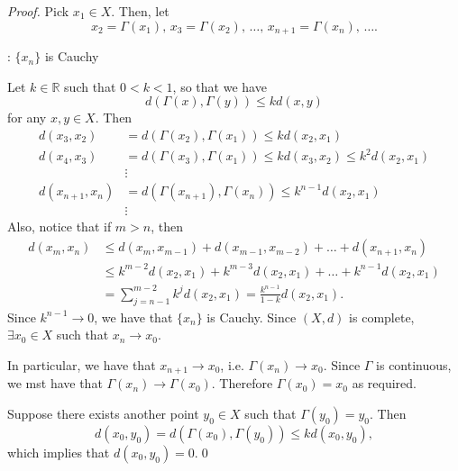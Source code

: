 \documentclass[notoc,notitlepage]{tufte-book}
\begin{document}
\begin{proof}
  Pick $x_1 \in X$. Then, let
  \begin{equation*}
    x_2 = \Gamma(x_1), \, x_3 = \Gamma(x_2), \, \ldots , \, x_{n + 1} = \Gamma(x_n), \, \ldots .
  \end{equation*}

  \noindent
  : $\{ x_n \}$ is Cauchy

  Let $k \in \mathbb{R}$ such that $0 < k < 1$, so that we have
  \begin{equation*}
    d \left( \Gamma(x), \Gamma(y) \right) \leq k d(x, y)
  \end{equation*}
  for any $x, y \in X$. Then
  \begin{align*}
    d(x_3, x_2) &= d( \Gamma(x_2), \Gamma(x_1) ) \leq k d(x_2, x_1) \\
    d(x_4, x_3) &= d( \Gamma(x_3), \Gamma(x_1) ) \leq k d(x_3, x_2) \leq k^2 d(x_2, x_1) \\
                & \vdots \\
    d(x_{n + 1}, x_n) &= d( \Gamma(x_{n + 1}), \Gamma(x_n) ) \leq k^{n - 1} d(x_2, x_1) \\
                      & \vdots
  \end{align*}
  Also, notice that if $m > n$, then
  \begin{align*}
    d(x_m, x_n) &\leq d(x_m, x_{m - 1}) + d(x_{m - 1}, x_{m - 2}) + \hdots + d(x_{n + 1}, x_n) \\
                &\leq k^{m - 2} d(x_2, x_1) + k^{m - 3} d(x_2, x_1) + \hdots + k^{n - 1} d(x_2, x_1) \\
                &= \sum_{j=n-1}^{m-2} k^j d(x_2, x_1) = \frac{k^{n - 1}}{1 - k} d(x_2, x_1).
  \end{align*}
  Since $k^{n - 1} \to 0$, we have that $\{ x_n \}$ is Cauchy. Since $(X, d)$ is complete, $\exists x_0 \in X$ such that $x_n \to x_0$.

  In particular, we have that $x_{n + 1} \to x_0$, i.e. $\Gamma(x_n) \to x_0$. Since $\Gamma$ is continuous, we mst have that $\Gamma(x_n) \to \Gamma(x_0)$. Therefore $\Gamma(x_0) = x_0$ as required.

   Suppose there exists another point $y_0 \in X$ such that $\Gamma(y_0) = y_0$. Then
  \begin{equation*}
    d(x_0, y_0) = d(\Gamma(x_0), \Gamma(y_0)) \leq kd(x_0, y_0),
  \end{equation*}
  which implies that $d(x_0, y_0) = 0$.\qed\
\end{proof}
\end{document}
